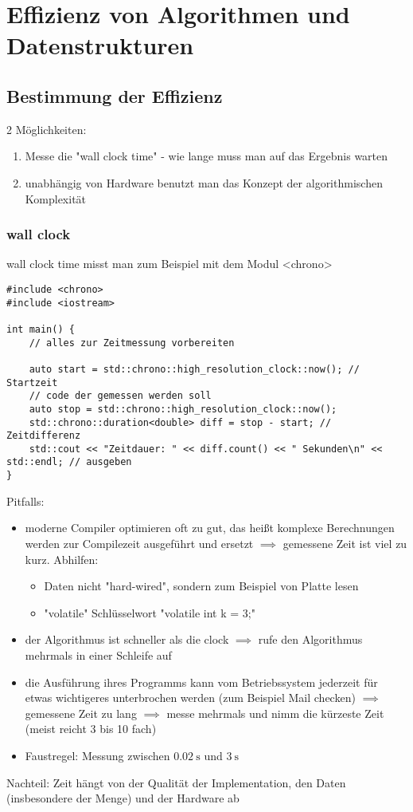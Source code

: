 \documentclass[a4paper]{scrartcl}
\theoremstyle{definition}
\theoremstyle{plain}
\theoremstyle{remark}
\theoremstyle{remark}
\begin{document}
\section{Effizienz von Algorithmen und Datenstrukturen}
\label{sec-15}
\subsection{Bestimmung der Effizienz}
\label{sec-15-1}
2 Möglichkeiten:
\begin{enumerate}
\item Messe die "wall clock time" - wie lange muss man auf das Ergebnis warten
\item unabhängig von Hardware benutzt man das Konzept der algorithmischen Komplexität
\end{enumerate}
\subsubsection{wall clock}
\label{sec-15-1-1}
wall clock time misst man zum Beispiel mit dem Modul <chrono>
\begin{verbatim}
#include <chrono>
#include <iostream>

int main() {
	// alles zur Zeitmessung vorbereiten

	auto start = std::chrono::high_resolution_clock::now(); // Startzeit
	// code der gemessen werden soll
	auto stop = std::chrono::high_resolution_clock::now();
	std::chrono::duration<double> diff = stop - start; // Zeitdifferenz
	std::cout << "Zeitdauer: " << diff.count() << " Sekunden\n" << std::endl; // ausgeben
}
\end{verbatim}
Pitfalls:
\begin{itemize}
\item moderne Compiler optimieren oft zu gut, das heißt komplexe Berechnungen werden zur Compilezeit ausgeführt und ersetzt $\implies$ gemessene Zeit ist viel zu kurz.
Abhilfen:
\begin{itemize}
\item Daten nicht "hard-wired", sondern zum Beispiel von Platte lesen
\item "volatile" Schlüsselwort "volatile int k = 3;"
\end{itemize}
\item der Algorithmus ist schneller als die clock $\implies$ rufe den Algorithmus mehrmals in einer Schleife
auf
\item die Ausführung ihres Programms kann vom Betriebssystem jederzeit für etwas wichtigeres unterbrochen werden
(zum Beispiel Mail checken) $\implies$ gemessene Zeit zu lang $\implies$ messe
mehrmals und nimm die kürzeste Zeit (meist reicht 3 bis 10 fach)
\item Faustregel: Messung zwischen $\SI{0.02}{\second}$ und $\SI{3}{\second}$
\end{itemize}
Nachteil: Zeit hängt von der Qualität der Implementation, den Daten (insbesondere der Menge) und der Hardware ab
\end{document}
